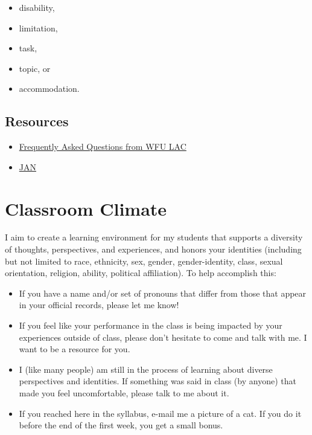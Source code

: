 \documentclass[
]{book}
\providecommand{\tightlist}{%
  \setlength{\itemsep}{0pt}\setlength{\parskip}{0pt}}
\begin{document}
\begin{itemize}
\tightlist
\item
  disability,
\item
  limitation,
\item
  task,
\item
  topic, or
\item
  accommodation.
\end{itemize}

\hypertarget{resources}{%
\section{Resources}\label{resources}}

\begin{itemize}
\tightlist
\item
  \href{https://lac.wfu.edu/frequently-asked-questions-about-lac-ds/}{Frequently Asked Questions from WFU LAC}
\item
  \href{https://askjan.org/}{JAN}
\end{itemize}

\hypertarget{classroom-climate}{%
\chapter{Classroom Climate}\label{classroom-climate}}

I aim to create a learning environment for my students that supports a diversity of thoughts, perspectives, and experiences, and honors your identities (including but not limited to race, ethnicity, sex, gender, gender-identity, class, sexual orientation, religion, ability, political affiliation). To help accomplish this:

\begin{itemize}
\item
  If you have a name and/or set of pronouns that differ from those that appear in your official records, please let me know!
\item
  If you feel like your performance in the class is being impacted by your experiences outside of class, please don't hesitate to come and talk with me. I want to be a resource for you.
\item
  I (like many people) am still in the process of learning about diverse perspectives and identities. If something was said in class (by anyone) that made you feel uncomfortable, please talk to me about it.
\item
  If you reached here in the syllabus, e-mail me a picture of a cat. If you do it before the end of the first week, you get a small bonus.
\end{itemize}
\end{document}
